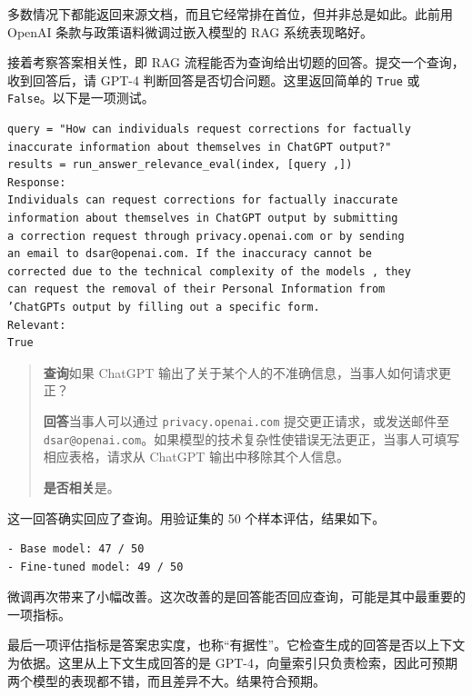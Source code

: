 多数情况下都能返回来源文档，而且它经常排在首位，但并非总是如此。此前用 OpenAI 条款与政策语料微调过嵌入模型的 RAG 系统表现略好。

接着考察答案相关性，即 RAG 流程能否为查询给出切题的回答。提交一个查询，收到回答后，请 GPT-4 判断回答是否切合问题。这里返回简单的 \texttt{True} 或 \texttt{False}。以下是一项测试。

\begin{lstlisting}[caption={答案相关性示例},label={lst:ch07-answer-example}]
query = "How can individuals request corrections for factually
inaccurate information about themselves in ChatGPT output?"
results = run_answer_relevance_eval(index, [query ,])
Response:
Individuals can request corrections for factually inaccurate
information about themselves in ChatGPT output by submitting
a correction request through privacy.openai.com or by sending
an email to dsar@openai.com. If the inaccuracy cannot be
corrected due to the technical complexity of the models , they
can request the removal of their Personal Information from
’ChatGPTs output by filling out a specific form.
Relevant:
True
\end{lstlisting}

\begin{quote}\small
\textbf{查询}\quad 如果 ChatGPT 输出了关于某个人的不准确信息，当事人如何请求更正？

\textbf{回答}\quad 当事人可以通过 \nolinkurl{privacy.openai.com} 提交更正请求，或发送邮件至 \nolinkurl{dsar@openai.com}。如果模型的技术复杂性使错误无法更正，当事人可填写相应表格，请求从 ChatGPT 输出中移除其个人信息。

\textbf{是否相关}\quad 是。
\end{quote}

这一回答确实回应了查询。用验证集的 50 个样本评估，结果如下。

\noindent\begin{minipage}{\linewidth}
\begin{lstlisting}[caption={答案相关性分数},label={lst:ch07-answer-scores}]
- Base model: 47 / 50
- Fine-tuned model: 49 / 50
\end{lstlisting}
\end{minipage}\par

微调再次带来了小幅改善。这次改善的是回答能否回应查询，可能是其中最重要的一项指标。

最后一项评估指标是答案忠实度，也称“有据性”。它检查生成的回答是否以上下文为依据。这里从上下文生成回答的是 GPT-4，向量索引只负责检索，因此可预期两个模型的表现都不错，而且差异不大。结果符合预期。

